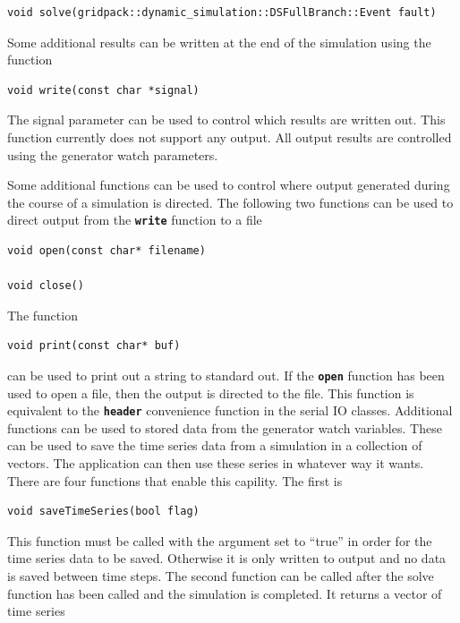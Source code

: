 \documentclass[12pt]{report} %
\begin{document}
{
\color{red}
\begin{Verbatim}[fontseries=b]
void solve(gridpack::dynamic_simulation::DSFullBranch::Event fault)
\end{Verbatim}
}

Some additional results can be written at the end of the simulation using the function

{
\color{red}
\begin{Verbatim}[fontseries=b]
void write(const char *signal)
\end{Verbatim}
}

The signal parameter can be used to control which results are written out. This function currently does not support any output. All output results are controlled using the generator watch parameters.

Some additional functions can be used to control where output generated during the course of a simulation is directed. The following two functions can be used to direct output from the \texttt{\textbf{write}} function to a file

{
\color{red}
\begin{Verbatim}[fontseries=b]
void open(const char* filename)

void close()
\end{Verbatim}
}

The function

{
\color{red}
\begin{Verbatim}[fontseries=b]
void print(const char* buf)
\end{Verbatim}
}

can be used to print out a string to standard out. If the \texttt{\textbf{open}} function has been used to open a file, then the output is directed to the file. This function is equivalent to the \texttt{\textbf{header}} convenience function in the serial IO classes.
Additional functions can be used to stored data from the generator watch variables. These can be used to save the time series data from a simulation in a collection of vectors. The application can then use these series in whatever way it wants. There are four functions that enable this capility. The first is

{
\color{red}
\begin{Verbatim}[fontseries=b]
void saveTimeSeries(bool flag)
\end{Verbatim}
}

This function must be called with the argument set to ``true'' in order for the time series data to be saved. Otherwise it is only written to output and no data is saved between time steps. The second function can be called after the solve function has been called and the simulation is completed. It returns a vector of time series
\end{document}
